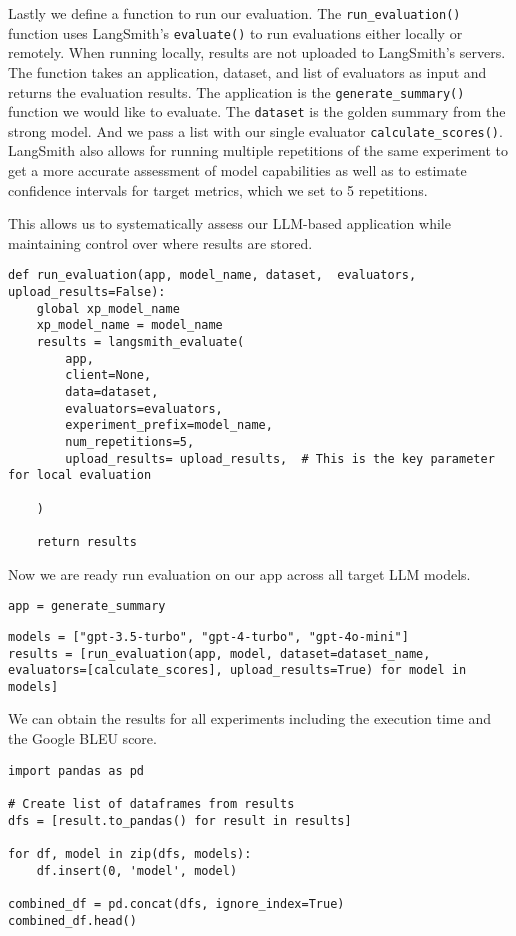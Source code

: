 Lastly we define a function to run our evaluation. The \texttt{run\_evaluation()} function uses LangSmith's \texttt{evaluate()} to run evaluations either locally or remotely. When running locally, results are not uploaded to LangSmith's servers. The function takes an application, dataset, and list of evaluators as input and returns the evaluation results. The application is the \texttt{generate\_summary()} function we would like to evaluate. The \texttt{dataset} is the golden summary from the strong model. And we pass a list with our single evaluator \texttt{calculate\_scores()}. LangSmith also allows for running multiple repetitions of the same experiment to get a more accurate assessment of model capabilities as well as to estimate confidence intervals for target metrics, which we set to 5 repetitions.

This allows us to systematically assess our LLM-based application while maintaining control over where results are stored.

\begin{verbatim}
def run_evaluation(app, model_name, dataset,  evaluators, upload_results=False):
    global xp_model_name
    xp_model_name = model_name
    results = langsmith_evaluate(
        app,
        client=None,
        data=dataset,
        evaluators=evaluators,
        experiment_prefix=model_name,
        num_repetitions=5,
        upload_results= upload_results,  # This is the key parameter for local evaluation

    )
    
    return results
\end{verbatim}
Now we are ready run evaluation on our app across all target LLM models.

\begin{verbatim}
app = generate_summary
\end{verbatim}

\begin{verbatim}
models = ["gpt-3.5-turbo", "gpt-4-turbo", "gpt-4o-mini"]
results = [run_evaluation(app, model, dataset=dataset_name, evaluators=[calculate_scores], upload_results=True) for model in models]
\end{verbatim}

We can obtain the results for all experiments including the execution time and the Google BLEU score.

\begin{verbatim}
import pandas as pd

# Create list of dataframes from results
dfs = [result.to_pandas() for result in results]

for df, model in zip(dfs, models):
    df.insert(0, 'model', model)

combined_df = pd.concat(dfs, ignore_index=True)
combined_df.head()
\end{verbatim}



